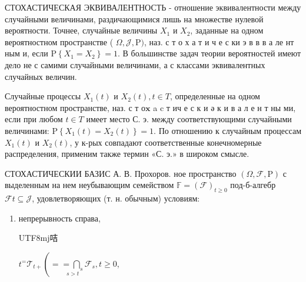 \documentclass[10pt]{article}
\begin{document}
СТОХАСТИЧЕСКАЯ ЭКВИВАЛЕНТНОСТЬ - отношение эквивалентности между случайными величинами, раздичающимися лишь на множестве нулевой вероятности. Точнее, случайные величины $X_{1}$ и $X_{2}$, заданные на одном вероятностном пространстве ( $\Omega, \mathscr{J}, \mathrm{P})$, наз. с т о х а т и ч е с ки э в в в а ле нт ным и, если $\mathrm{P}\left\{X_{1}=X_{2}\right\}=1$. В большинстве задач теории вероятностей имеют дело не с самими случайными величинами, а с классами эквивалентных случайных величин.



Случайные процессы $X_{1}(t)$ и $X_{2}(t), t \in T$, определенные на одном вероятностном пространстве, наз. с т о$\mathbf{x}$ a c т ич е с $к$ и $ә$ к и в а л е н т ны ми, если при любом $t \in T$ имеет место С. э. между соответствующими случайными величинами: $\mathrm{P}\left\{X_{1}(t)=X_{2}(t)\right\}=1$. По отношению к случайным процессам $X_{1}(t)$ и $X_{2}(t)$, у к-рых совпадают соответственные конечномерные распределения, применим также термин «С. э.» в широком смысле.



СТОХАСТИЧЕСКИИ БАЗИС А. В. Прохоров. ное пространство $(\Omega, \mathscr{F}, \mathrm{P})$ с выделенным на нем неубывающим семейством $\mathbb{F}=(\mathscr{F})_{t \geqslant 0}$ под-б-алгебр $\mathscr{F} t \subseteq \mathscr{J}$, удовлетворяющих (т. н. обычным) условиям:



\begin{enumerate}

  \item непрерывность справа, \begin{CJK}{UTF8}{mj}咭\end{CJK} $t^{=} \mathscr{T}_{t+}\left(=\underset{s>t}{=\bigcap_{s}} \mathscr{F}_{s}, t \geqslant 0\right.$,

\end{enumerate}
\end{document}
